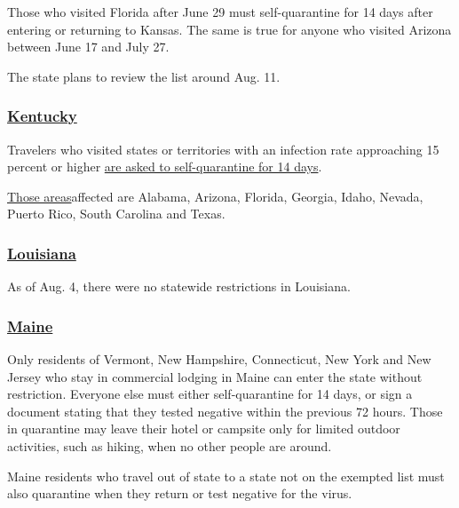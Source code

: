 Those who visited Florida after June 29 must self-quarantine for 14 days
after entering or returning to Kansas. The same is true for anyone who
visited Arizona between June 17 and July 27.

The state plans to review the list around Aug. 11.

\hypertarget{kentucky}{%
\subsubsection{\texorpdfstring{\href{https://governor.ky.gov/covid19}{Kentucky}}{Kentucky}}\label{kentucky}}

Travelers who visited states or territories with an infection rate
approaching 15 percent or higher
\href{https://coronavirus.jhu.edu/testing/testing-positivity}{are asked
to self-quarantine for 14 days}.

\href{https://kentucky.gov/Pages/Activity-stream.aspx?n=CHFS\&prId=281}{Those
areas}affected are Alabama, Arizona, Florida, Georgia, Idaho, Nevada,
Puerto Rico, South Carolina and Texas.

\hypertarget{louisiana}{%
\subsubsection{\texorpdfstring{\href{https://louisianatravelassociation.org/covid-19-resources}{Louisiana}}{Louisiana}}\label{louisiana}}

As of Aug. 4, there were no statewide restrictions in Louisiana.

\hypertarget{maine}{%
\subsubsection{\texorpdfstring{\href{https://www.maine.gov/covid19/restartingmaine/keepmainehealthy/faqs}{Maine}}{Maine}}\label{maine}}

Only residents of Vermont, New Hampshire, Connecticut, New York and New
Jersey who stay in commercial lodging in Maine can enter the state
without restriction. Everyone else must either self-quarantine for 14
days, or sign a document stating that they tested negative within the
previous 72 hours. Those in quarantine may leave their hotel or campsite
only for limited outdoor activities, such as hiking, when no other
people are around.

Maine residents who travel out of state to a state not on the exempted
list must also quarantine when they return or test negative for the
virus.

